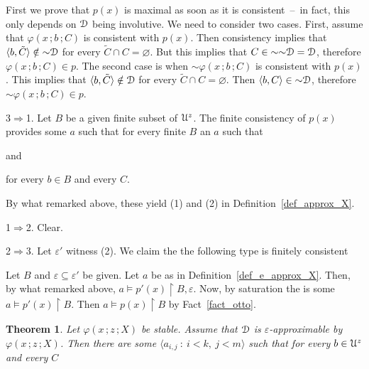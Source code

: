 \documentclass{amsproc}
\makeatletter
\newcounter{thm}
\theoremstyle{mio}
\newtheorem{theorem}[thm]{Theorem}\tcolorboxenvironment{theorem}{mythm}
\providecommand{\proofNameStyle}{\bfseries}
\renewenvironment{proof}[1][\proofname]{\par
  \pushQED{\qed}%
  \normalfont%
  \trivlist
  \item[\hskip\labelsep
        \proofNameStyle
    #1\@addpunct{.}]\ignorespaces
}{%
  \popQED\endtrivlist\@endpefalse
}
\makeatother
\begin{document}
\begin{proof}
  First we prove that $p(x)$ is maximal as soon as it is consistent~--~in fact, this only depends on ${\EuScript D}$ being involutive.
  We need to consider two cases.
  First, assume that $\varphi(x\,;b\,;C)$ is consistent with $p(x)$.
  Then consistency implies that $\langle b,\tilde C\rangle\notin{\sim}{\EuScript D}$ for every $\tilde C\cap C=\varnothing$.
  But this implies that $C\in{\sim}{\sim}{\EuScript D}={\EuScript D}$, therefore $\varphi(x\,;b\,;C)\in p$.
  The second case is when ${\sim}\varphi(x\,;b\,;C)$ is consistent with $p(x)$.
  This implies that $\langle b,\tilde C\rangle\notin{\EuScript D}$ for every $\tilde C\cap C=\varnothing$.
  Then $\langle b,C\rangle\in{\sim}{\EuScript D}$,  therefore ${\sim}\varphi(x\,;b\,;C)\in p$.

  3$\Rightarrow$1.
  Let $B$ be a given finite subset of ${\EuScript U}^z$.
  The finite consistency of $p(x)$ provides some $a$ such that for every finite $B$ an $a$ such that

  \quad and 
  
  \hfill for every $b\in B$ and every $C$. 

  By what remarked above, these yield (1) and (2) in Definition~\ref{def_approx_X}.
  
  1$\Rightarrow$2. Clear.

  2$\Rightarrow$3.
  Let $\varepsilon'$ witness (2).
  We claim the the following type is finitely consistent

  \smallskip

  
  Let $B$ and $\varepsilon\subseteq\varepsilon'$ be given.
  Let $a$ be as in Definition~\ref{def_e_approx_X}.
  Then, by what remarked above, $a\models p'(x)\restriction B, \varepsilon$.
  Now, by saturation the is some $a \models p'(x)\restriction B$.
  Then $a \models p(x)\restriction B$ by Fact~\ref{fact_otto}.
\end{proof}

\begin{theorem}\label{thm_epsilon_stability_definability}
  Let $\varphi(x\,;z\,;X)$ be stable.
  Assume that ${\EuScript D}$ is $\varepsilon$-approximable by $\varphi(x\,;z\,;X)$.
  Then there are some $\langle a_{i,j}\ :\ i< k,\ j<m\rangle$ such that for every $b\in{\EuScript U}^z$ and every $C$\medskip

  \medskip

\end{theorem}
\end{document}
